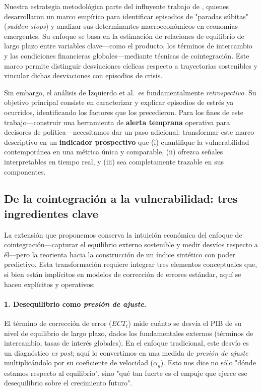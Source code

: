 \documentclass[11pt,a4paper]{article}
\numberwithin{equation}{section}
\begin{document}
Nuestra estrategia metodológica parte del influyente trabajo de \textcite{izquierdo2008booms}, quienes desarrollaron un marco empírico para identificar episodios de "paradas súbitas" (\emph{sudden stops}) y analizar sus determinantes macroeconómicos en economías emergentes. Su enfoque se basa en la estimación de relaciones de equilibrio de largo plazo entre variables clave—como el producto, los términos de intercambio y las condiciones financieras globales—mediante técnicas de cointegración. Este marco permite distinguir desviaciones cíclicas respecto a trayectorias sostenibles y vincular dichas desviaciones con episodios de crisis.

Sin embargo, el análisis de Izquierdo et al.\ es fundamentalmente \textit{retrospectivo}. Su objetivo principal consiste en caracterizar y explicar episodios de estrés ya ocurridos, identificando los factores que los precedieron. Para los fines de este trabajo—construir una herramienta de \textbf{alerta temprana} operativa para decisores de política—necesitamos dar un paso adicional: transformar este marco descriptivo en un \textbf{indicador prospectivo} que (i) cuantifique la vulnerabilidad contemporánea en una métrica única y comparable, (ii) ofrezca señales interpretables en tiempo real, y (iii) sea completamente trazable en sus componentes.

\subsection{De la cointegración a la vulnerabilidad: tres ingredientes clave}

La extensión que proponemos conserva la intuición económica del enfoque de cointegración—capturar el equilibrio externo sostenible y medir desvíos respecto a él—pero la reorienta hacia la construcción de un índice sintético con poder predictivo. Esta transformación requiere integrar tres elementos conceptuales que, si bien están implícitos en modelos de corrección de errores estándar, aquí se hacen explícitos y operativos:

\paragraph{1. Desequilibrio como \textit{presión de ajuste}.}
El término de corrección de error ($ECT_t$) mide cuánto se desvía el PIB de su nivel de equilibrio de largo plazo, dados los fundamentales externos (términos de intercambio, tasas de interés globales). En el enfoque tradicional, este desvío es un diagnóstico \textit{ex post}; aquí lo convertimos en una medida de \textit{presión de ajuste} multiplicándolo por su coeficiente de velocidad ($\alpha_y$). Esto nos dice no sólo "dónde estamos respecto al equilibrio", sino "qué tan fuerte es el empuje que ejerce ese desequilibrio sobre el crecimiento futuro".
\end{document}
